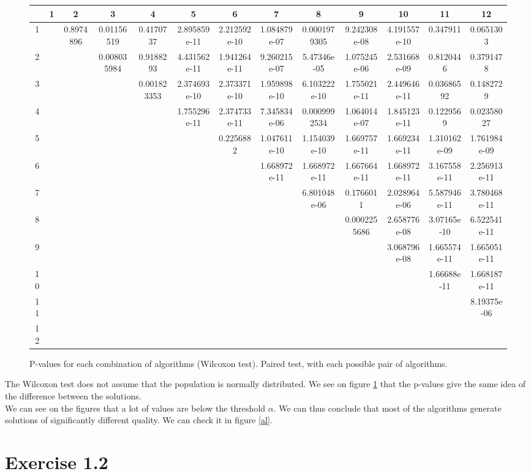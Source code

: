 \begin{landscape}
\begin{figure}
\begin{center}
	\begin{tabular}{|c|c|c|c|c|c|c|c|c|c|c|c|c|} \hline
		& 1 & 2 & 3 & 4 & 5 & 6 & 7 & 8 & 9 & 10 & 11 & 12 \\ \hline \hline
		1 & & 0.8974896 & 0.01156519 & 0.4170737 & 2.895859e-11 & 2.212592e-10 & 1.084879e-07 & 0.0001979305 & 9.242308e-08 & 4.191557e-10 & 0.347911 & 0.0651303 \\ \hline
		2 & &  & 0.008035984 & 0.9188293 & 4.431562e-11 & 1.941264e-11 & 9.260215e-07 & 5.47346e-05 & 1.075245e-06 & 2.531668e-09 & 0.8120446 & 0.3791478 \\ \hline
		3 & & &  & 0.001823353 & 2.374693e-10 & 2.373371e-10 & 1.959898e-10 & 6.103222e-10 & 1.755021e-11 & 2.449646e-11 & 0.03686592 & 0.1482729 \\ \hline
		4 & & & &  & 1.755296e-11 & 2.374733e-11 & 7.345834e-06 & 0.0009992534 & 1.064014e-07 & 1.845123e-11 & 0.1229569 & 0.02358027 \\ \hline
		5 & & & & &  & 0.2256882 & 1.047611e-10 & 1.154039e-10 & 1.669757e-11 & 1.669234e-11 & 1.310162e-09 & 1.761984e-09 \\ \hline
		6 & & & & & &  & 1.668972e-11 & 1.668972e-11 & 1.667664e-11 & 1.668972e-11 & 3.167558e-11 & 2.256913e-11 \\ \hline
		7 & & & & & & &  & 6.801048e-06 & 0.1766011 & 2.028964e-06 & 5.587946e-11 & 3.780468e-11 \\ \hline
		8 & & & & & & & & & 0.0002255686 & 2.658776e-08 & 3.07165e-10 & 6.522541e-11 \\ \hline
		9 & & & & & & & & &  & 3.068796e-08 & 1.665574e-11 & 1.665051e-11 \\ \hline
		10 & & & & & & & & & & & 1.66688e-11 & 1.668187e-11 \\ \hline
		11 & & & & & & & & & & & & 8.19375e-06 \\ \hline
		12 & & & & & & & & & & & & \\ \hline

	
	\end{tabular}
\end{center}
\caption{P-values for each combination of algorithms (Wilcoxon test). Paired test, with each possible pair of algorithms.}
\label{pv wilcox}
\end{figure}

\end{landscape}

The Wilcoxon test does not assume that the population is normally distributed. We see on figure \ref{pv wilcox} that the p-values give the same idea of the difference between the solutions.\\

We can see on the figures that a lot of values are below the threshold $\alpha$. We can thus conclude that most of the algorithms generate solutions of significantly different quality. We can check it in figure \ref{al}.


\section{Exercise 1.2}

